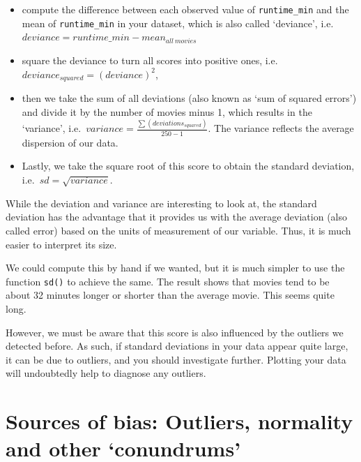 \documentclass[
]{book}
\newenvironment{Shaded}{\begin{snugshade}}{\end{snugshade}}
\newcommand{\DocumentationTok}[1]{\textcolor[rgb]{0.56,0.35,0.01}{\textbf{\textit{#1}}}}
\newcommand{\FunctionTok}[1]{\textcolor[rgb]{0.00,0.00,0.00}{#1}}
\newcommand{\NormalTok}[1]{#1}
\newcommand{\SpecialCharTok}[1]{\textcolor[rgb]{0.00,0.00,0.00}{#1}}
\begin{document}
\begin{itemize}
\item
  compute the difference between each observed value of \texttt{runtime\_min} and the mean of \texttt{runtime\_min} in your dataset, which is also called `deviance', i.e.~\(deviance = runtime\_min - mean_{all\ movies}\)
\item
  square the deviance to turn all scores into positive ones, i.e.~\(deviance_{squared} = (deviance)^2\),
\item
  then we take the sum of all deviations (also known as `sum of squared errors') and divide it by the number of movies minus 1, which results in the `variance', i.e.~\(variance = \frac{\sum(deviations_{squared})}{250-1}\). The variance reflects the average dispersion of our data.
\item
  Lastly, we take the square root of this score to obtain the standard deviation, i.e.~\(sd = \sqrt{variance}\).
\end{itemize}

While the deviation and variance are interesting to look at, the standard deviation has the advantage that it provides us with the average deviation (also called error) based on the units of measurement of our variable. Thus, it is much easier to interpret its size.

We could compute this by hand if we wanted, but it is much simpler to use the function \texttt{sd()} to achieve the same. The result shows that movies tend to be about 32 minutes longer or shorter than the average movie. This seems quite long.

\begin{Shaded}
\end{Shaded}

However, we must be aware that this score is also influenced by the outliers we detected before. As such, if standard deviations in your data appear quite large, it can be due to outliers, and you should investigate further. Plotting your data will undoubtedly help to diagnose any outliers.

\hypertarget{sources-of-bias}{%
\chapter{Sources of bias: Outliers, normality and other `conundrums'}\label{sources-of-bias}}
\end{document}

